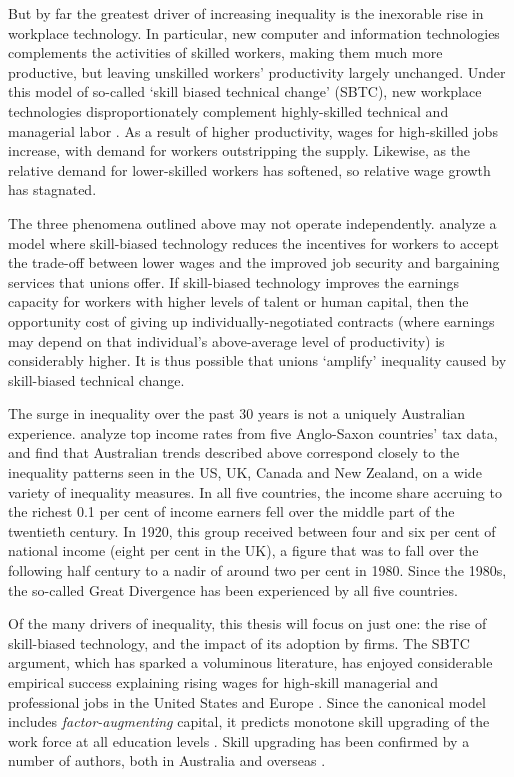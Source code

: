 But by far the greatest driver of increasing inequality is the inexorable rise in workplace technology. In particular, new computer and information technologies complements the activities of skilled workers, making them much more productive, but leaving unskilled workers' productivity largely unchanged. Under this model of so-called `skill biased technical change' (SBTC), new workplace technologies disproportionately complement highly-skilled technical and managerial labor \citep{Griliches1969,Autor2006}. As a result of higher productivity, wages for high-skilled jobs increase, with demand for workers outstripping the supply. Likewise, as the relative demand for lower-skilled workers has softened, so relative wage growth has stagnated. 

The three phenomena outlined above may not operate independently. \citet{Acemoglu2003} analyze a model where skill-biased technology reduces the incentives for workers to accept the trade-off between lower wages and the improved job security and bargaining services that unions offer. If skill-biased technology improves the earnings capacity for workers with higher levels of talent or human capital, then the opportunity cost of giving up individually-negotiated contracts (where earnings may depend on that individual's above-average level of productivity) is considerably higher. It is thus possible that unions `amplify' inequality caused by skill-biased technical change.

The surge in inequality over the past 30 years is not a uniquely Australian experience. \citet{Atkinson2013} analyze top income rates from five Anglo-Saxon countries' tax data, and find that Australian trends described above correspond closely to the inequality patterns seen in the US, UK, Canada and New Zealand, on a wide variety of inequality measures. In all five countries, the income share accruing to the richest 0.1 per cent of income earners fell over the middle part of the twentieth century. In 1920, this group received between four and six per cent of national income (eight per cent in the UK), a figure that was to fall over the following half century to a nadir of around two per cent in 1980. Since the 1980s, the so-called Great Divergence has been experienced by all five countries. 

Of the many drivers of inequality, this thesis will focus on just one: the rise of skill-biased technology, and the impact of its adoption by firms. The SBTC argument, which has sparked a voluminous literature, has enjoyed considerable empirical success explaining rising wages for high-skill managerial and professional jobs in the United States and Europe \citep{Katz1992}. Since the canonical model includes \emph{factor-augmenting} capital, it predicts monotone skill upgrading of the work force at all education levels \citep{Levy2003}. Skill upgrading has been confirmed by a number of authors, both in Australia \citep{Esposto2012, Wooden2000, Cully1999} and overseas \citep{Autor2008}. 

